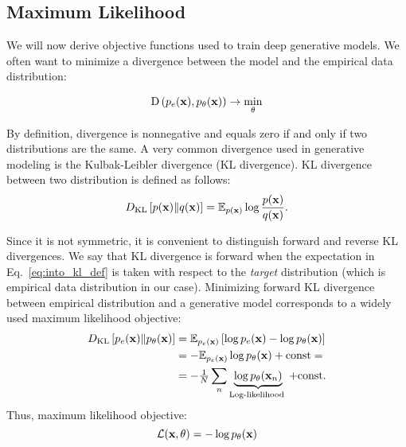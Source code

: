 \subsection{Maximum Likelihood}
We will now derive objective functions used to train deep generative models. We often want to minimize a divergence between the model and the empirical data distribution:

\begin{equation}\label{eq:intro_divergence}
\begin{aligned}
\text{D}\left(p_{e}(\rvx), p_{\theta}(\rvx)\right) \rightarrow \min_{\theta}
\end{aligned}
\end{equation} 

By definition, divergence is nonnegative and equals zero if and only if two distributions are the same. 
A very common divergence used in generative modeling is the Kulbak-Leibler divergence (KL divergence). KL divergence between two distribution is defined as follows:
\begin{equation}
\begin{aligned} \label{eq:into_kl_def}
 \KL{p(\rvx)}{q(\rvx)} = \E_{p(\rvx)} \log \frac{p(\rvx)}{q(\rvx)}.
\end{aligned}
\end{equation}

Since it is not symmetric, it is convenient to distinguish forward and reverse KL divergences. We say that KL divergence is forward when the expectation in Eq.~\ref{eq:into_kl_def} is taken with respect to the \textit{target} distribution (which is empirical data distribution in our case). Minimizing forward KL divergence between empirical distribution and a generative model corresponds to a widely used maximum likelihood objective:
\begin{equation}
\begin{aligned}
D_{\mathrm{KL}}\left[p_{e}({\mathbf{x}})\|p_{\theta}({\mathbf{x}})\right] & =  \mathbb{E}_{p_{e}({\mathbf{x}})}\left[ \log p_{e}({\mathbf{x}}) - \log p_{\theta}({\mathbf{x}})\right] \\
& =  - \mathbb{E}_{p_{e}({\mathbf{x}})} \log p_{\theta}({\mathbf{x}}) + \text{const}=\\
& =  - \tfrac1N \sum_n \underbrace{\log p_{\theta}({\mathbf{x}}_n)}_{\text{Log-likelihood }}  + \text{const}.
\end{aligned}
\end{equation}
Thus, maximum likelihood objective:
\begin{equation}
    \mathcal{L}({\mathbf{x}}, \theta) = -\log p_{\theta}({\mathbf{x}})
\end{equation}

